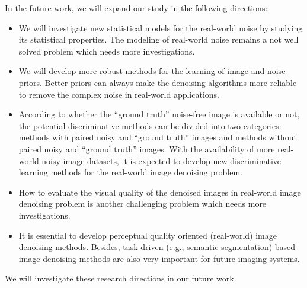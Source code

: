 In the future work, we will expand our study in the following directions:
\vspace{-3mm}
\begin{itemize}
\item We will investigate new statistical models for the real-world noise by studying its statistical properties. The modeling of real-world noise remains a not well solved problem which needs more investigations.
\vspace{-3mm}
\item We will develop more robust methods for the learning of image and noise priors. Better priors can always make the denoising algorithms more reliable to remove the complex noise in real-world applications.
\vspace{-3mm}
\item According to whether the ``ground truth'' noise-free image is available or not, the potential discriminative methods can be divided into two categories: methods with paired noisy and ``ground truth'' images and methods without paired noisy and ``ground truth'' images. With the availability of more real-world noisy image datasets, it is expected to develop new discriminative learning methods for the real-world image denoising problem. 
\vspace{-3mm}
\item How to evaluate the visual quality of the denoised images in real-world image denoising problem is another challenging problem which needs more investigations.
\vspace{-3mm}
\item It is essential to develop perceptual quality oriented (real-world) image denoising methods. Besides, task driven (e.g., semantic segmentation) based image denoising methods are also very important for future imaging systems.
\vspace{-3mm}
\end{itemize}

We will investigate these research directions in our future work.
